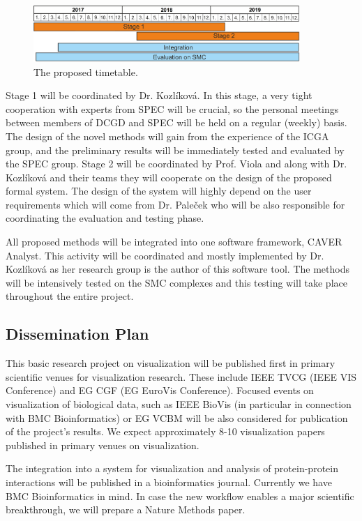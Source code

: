 \documentclass[11pt,a4paper,titlepage,oneside,onecolumn]{article}
\begin{document}
\begin{figure}[t]
\centering
\includegraphics[width=0.9\textwidth]{pics/timeline.png}
\caption{The proposed timetable.}
\label{timetable}
\end{figure}

Stage 1 will be coordinated by Dr. Kozl\'{i}kov\'{a}. 
In this stage, a very tight cooperation with experts from SPEC will be crucial, so the personal meetings between members of DCGD and SPEC will be held on a regular (weekly) basis. 
The design of the novel methods will gain from the experience of the ICGA group, and the preliminary results will be immediately tested and evaluated by the SPEC group. 
Stage 2 will be coordinated by Prof. Viola and along with Dr. Kozl\'{i}kov\'{a} and their teams they will cooperate on the design of the proposed formal system. 
The design of the system will highly depend on the user requirements which will come from Dr. Pale\v{c}ek who will be also responsible for coordinating the evaluation and testing phase.

All proposed methods will be integrated into one software framework, CAVER Analyst. This activity will be coordinated and mostly implemented by Dr. Kozl\'{i}kov\'{a} as her research group is the author of this software tool. The methods will be intensively tested on the SMC complexes and this testing will take place throughout the entire project.

\subsection{Dissemination Plan}
This basic research project on visualization will be published first in primary scientific venues for visualization research. These include IEEE TVCG (IEEE VIS Conference) and EG CGF (EG EuroVis Conference). Focused events on visualization of biological data, such as IEEE BioVis (in particular in connection with BMC Bioinformatics) or EG VCBM will be also considered for publication of the project's results. We expect approximately 8-10 visualization papers published in primary venues on visualization.

The integration into a system for visualization and analysis of protein-protein interactions will be published in a bioinformatics journal. Currently we have BMC Bioinformatics in mind. In case the new workflow enables a major scientific breakthrough, we will prepare a Nature Methods paper. 
\end{document}
